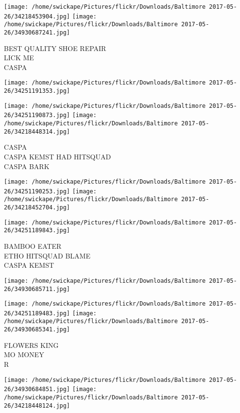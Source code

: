 \documentclass[10pt,letterpaper]{article}
\begin{document}
\vspace{0.25in}
\texttt{[image: /home/swickape/Pictures/flickr/Downloads/Baltimore 2017-05-26/34218453904.jpg]}
\texttt{[image: /home/swickape/Pictures/flickr/Downloads/Baltimore 2017-05-26/34930687241.jpg]}

BEST QUALITY SHOE REPAIR\\
LICK ME\\
CASPA
\pagebreak

\texttt{[image: /home/swickape/Pictures/flickr/Downloads/Baltimore 2017-05-26/34251191353.jpg]}

\vspace{0.25in}
\texttt{[image: /home/swickape/Pictures/flickr/Downloads/Baltimore 2017-05-26/34251190873.jpg]}
\texttt{[image: /home/swickape/Pictures/flickr/Downloads/Baltimore 2017-05-26/34218448314.jpg]}

CASPA\\
CASPA KEMST HAD HITSQUAD\\
CASPA BARK
\pagebreak

\texttt{[image: /home/swickape/Pictures/flickr/Downloads/Baltimore 2017-05-26/34251190253.jpg]}
\texttt{[image: /home/swickape/Pictures/flickr/Downloads/Baltimore 2017-05-26/34218452704.jpg]}

\texttt{[image: /home/swickape/Pictures/flickr/Downloads/Baltimore 2017-05-26/34251189843.jpg]}

BAMBOO EATER\\
ETHO HITSQUAD BLAME\\
CASPA KEMST
\pagebreak

\texttt{[image: /home/swickape/Pictures/flickr/Downloads/Baltimore 2017-05-26/34930685711.jpg]}

\vspace{0.25in}
\texttt{[image: /home/swickape/Pictures/flickr/Downloads/Baltimore 2017-05-26/34251189483.jpg]}
\texttt{[image: /home/swickape/Pictures/flickr/Downloads/Baltimore 2017-05-26/34930685341.jpg]}

FLOWERS KING\\
MO MONEY\\
R
\pagebreak

\texttt{[image: /home/swickape/Pictures/flickr/Downloads/Baltimore 2017-05-26/34930684851.jpg]}
\texttt{[image: /home/swickape/Pictures/flickr/Downloads/Baltimore 2017-05-26/34218448124.jpg]}
\end{document}
